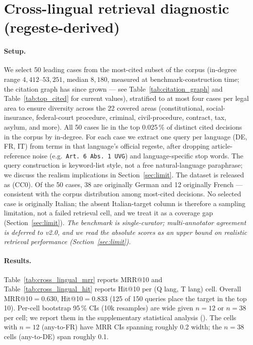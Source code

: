 \documentclass[11pt,a4paper]{article}
\begin{document}


\section{Cross-lingual retrieval diagnostic (regeste-derived)}\label{sec:crosslang}





\paragraph{Setup.} We select 50 leading cases from the most-cited subset of the corpus (in-degree range $4{,}412$--$53{,}251$, median $8{,}180$, measured at benchmark-construction time; the citation graph has since grown --- see Table~\ref{tab:citation_graph} and Table~\ref{tab:top_cited} for current values), stratified to at most four cases per legal area to ensure diversity across the 22 covered areas (constitutional, social-insurance, federal-court procedure, criminal, civil-procedure, contract, tax, asylum, and more). All 50 cases lie in the top 0.025\,\% of distinct cited decisions in the corpus by in-degree. For each case we extract one query per language (DE, FR, IT) from terms in that language's official regeste, after dropping article-reference noise (e.g.\ \texttt{Art.\ 6 Abs.\ 1 UVG}) and language-specific stop words. The query construction is keyword-list style, not a free natural-language paraphrase; we discuss the realism implications in Section~\ref{sec:limit}. The dataset is released as  (CC0). Of the 50 cases, 38 are originally German and 12 originally French --- consistent with the corpus distribution among most-cited decisions. No selected case is originally Italian; the absent Italian-target column is therefore a sampling limitation, not a failed retrieval cell, and we treat it as a coverage gap (Section~\ref{sec:limit}). \emph{The benchmark is single-curator; multi-annotator agreement is deferred to v2.0, and we read the absolute scores as an upper bound on realistic retrieval performance (Section~\ref{sec:limit}).}

\paragraph{Results.} Table~\ref{tab:cross_lingual_mrr} reports MRR@10 and Table~\ref{tab:cross_lingual_hit} reports Hit@10 per (Q lang, T lang) cell. Overall MRR@10$=$0.630, Hit@10$=$0.833 (125 of 150 queries place the target in the top 10). Per-cell bootstrap 95\,\% CIs (10k resamples) are wide given $n=12$ or $n=38$ per cell; we report them in the supplementary statistical analysis (). The cells with $n=12$ (any-to-FR) have MRR CIs spanning roughly 0.2 width; the $n=38$ cells (any-to-DE) span roughly 0.1.
\end{document}
